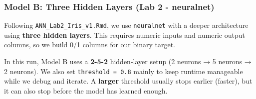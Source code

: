 \documentclass[
]{article}
\begin{document}
\subsubsection{Model B: Three Hidden Layers (Lab 2 -
neuralnet)}\label{model-b-three-hidden-layers-lab-2---neuralnet}

Following \texttt{ANN\_Lab2\_Iris\_v1.Rmd}, we use \texttt{neuralnet}
with a deeper architecture using \textbf{three hidden layers}. This
requires numeric inputs and numeric output columns, so we build 0/1
columns for our binary target.

In this run, Model B uses a \textbf{2-5-2} hidden-layer setup (2 neurons
→ 5 neurons → 2 neurons). We also set \texttt{threshold\ =\ 0.8} mainly
to keep runtime manageable while we debug and iterate. A \textbf{larger}
threshold usually stops earlier (faster), but it can also stop before
the model has learned enough.
\end{document}
